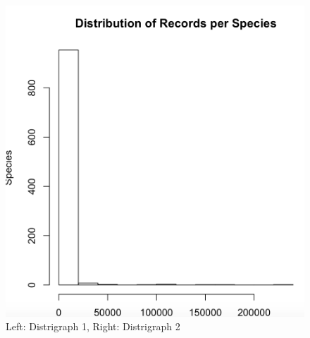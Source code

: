 \begin{figure}[htbp!]
   \includegraphics[scale=0.35]{pictures/biodiversity/distrograph2.jpg}
   \caption{Left: Distrigraph 1, Right: Distrigraph 2}
   \label{fig:distrigraph1}
\end{figure}


